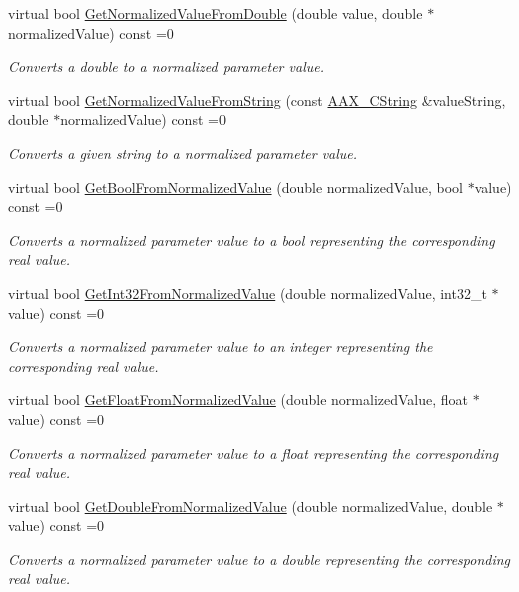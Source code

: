 \begin{Indent}
\begin{DoxyCompactItemize}
virtual bool \mbox{\hyperlink{a01857_a8ac820142f113788408d060d5054ff17}{Get\+Normalized\+Value\+From\+Double}} (double value, double $\ast$normalized\+Value) const =0
\begin{DoxyCompactList}\small\item\em Converts a double to a normalized parameter value. \end{DoxyCompactList}\item 
virtual bool \mbox{\hyperlink{a01857_ae4c1aa17e39fab796182f5b485920c29}{Get\+Normalized\+Value\+From\+String}} (const \mbox{\hyperlink{a01573}{A\+A\+X\+\_\+\+C\+String}} \&value\+String, double $\ast$normalized\+Value) const =0
\begin{DoxyCompactList}\small\item\em Converts a given string to a normalized parameter value. \end{DoxyCompactList}\item 
virtual bool \mbox{\hyperlink{a01857_a5be2681a41d588b693ec72a8c665a192}{Get\+Bool\+From\+Normalized\+Value}} (double normalized\+Value, bool $\ast$value) const =0
\begin{DoxyCompactList}\small\item\em Converts a normalized parameter value to a bool representing the corresponding real value. \end{DoxyCompactList}\item 
virtual bool \mbox{\hyperlink{a01857_a1928f0122ac787fe7019b56ea4aed81b}{Get\+Int32\+From\+Normalized\+Value}} (double normalized\+Value, int32\+\_\+t $\ast$value) const =0
\begin{DoxyCompactList}\small\item\em Converts a normalized parameter value to an integer representing the corresponding real value. \end{DoxyCompactList}\item 
virtual bool \mbox{\hyperlink{a01857_ab3c3706381e681108d03ea14b4989fb1}{Get\+Float\+From\+Normalized\+Value}} (double normalized\+Value, float $\ast$value) const =0
\begin{DoxyCompactList}\small\item\em Converts a normalized parameter value to a float representing the corresponding real value. \end{DoxyCompactList}\item 
virtual bool \mbox{\hyperlink{a01857_abeae0f2df8e8f133c4747152c72c2bcc}{Get\+Double\+From\+Normalized\+Value}} (double normalized\+Value, double $\ast$value) const =0
\begin{DoxyCompactList}\small\item\em Converts a normalized parameter value to a double representing the corresponding real value. \end{DoxyCompactList}\item 

\end{DoxyCompactItemize}
\end{Indent}
